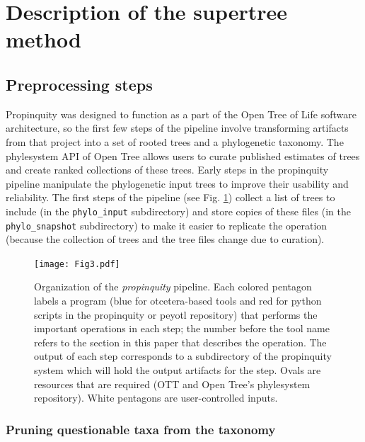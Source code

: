 \documentclass[fleqn,12pt,lineno,english]{wlpeerj}
\begin{document}
\section{Description of the supertree method}

\subsection{Preprocessing steps}

Propinquity was designed to function as a part of the Open Tree of
Life software architecture, so the first few steps of the pipeline
involve transforming artifacts from that project into a set of rooted
trees and a phylogenetic taxonomy. The phylesystem API \citep{McTavishEtAt2015}
of Open Tree allows users to curate published estimates of trees and
create ranked collections of these trees. Early steps in the propinquity
pipeline manipulate the phylogenetic input trees to improve their
usability and reliability. The first steps of the pipeline (see Fig.
\ref{fig:pipeline}) collect a list of trees to include (in the \texttt{phylo\_input}
subdirectory) and store copies of these files (in the \texttt{phylo\_snapshot}
subdirectory) to make it easier to replicate the operation (because
the collection of trees and the tree files change due to curation).
\begin{figure}
\begin{centering}
\texttt{[image: Fig3.pdf]}
\par\end{centering}
\caption{Organization of the \emph{propinquity} pipeline. Each colored pentagon
labels a program (blue for otcetera-based tools and red for python
scripts in the propinquity or peyotl repository) that performs the
important operations in each step; the number before the tool name
refers to the section in this paper that describes the operation.
The output of each step corresponds to a subdirectory of the propinquity
system which will hold the output artifacts for the step. Ovals are
resources that are required (OTT and Open Tree's phylesystem repository).
White pentagons are user-controlled inputs.}
\label{fig:pipeline}
\end{figure}


\subsubsection{Pruning questionable taxa from the taxonomy}
\end{document}
